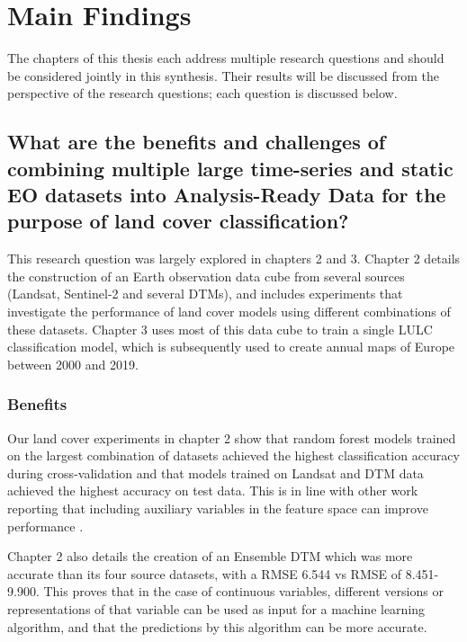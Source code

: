 \section{Main Findings}
    The chapters of this thesis each address multiple research questions and should be considered jointly in this synthesis. Their results will be discussed from the perspective of the research questions; each question is discussed below.
    
    \subsection{What are the benefits and challenges of combining multiple large time-series and static EO datasets into Analysis-Ready Data for the purpose of land cover classification?}
    \label{syn:rq1}

        This research question was largely explored in chapters 2 and 3. Chapter 2 details the construction of an Earth observation data cube from several sources (Landsat, Sentinel-2 and several DTMs), and includes experiments that investigate the performance of land cover models using different combinations of these datasets. Chapter 3 uses most of this data cube to train a single LULC classification model, which is subsequently used to create annual maps of Europe between 2000 and 2019. 

        \subsubsection{Benefits}
    
            Our land cover experiments in chapter 2 show that random forest models trained on the largest combination of datasets achieved the highest classification accuracy during cross-validation and that models trained on Landsat and DTM data achieved the highest accuracy on test data. This is in line with other work reporting that including auxiliary variables in the feature space can improve performance \citep{zhu2016optimizing, hurskainen2019auxiliary, hosseiny2022urban, santos2012multiscale}.

            Chapter 2 also details the creation of an Ensemble DTM which was more accurate than its four source datasets, with a RMSE 6.544 vs RMSE of 8.451-9.900. This proves that in the case of continuous variables, different versions or representations of that variable can be used as input for a machine learning algorithm, and that the predictions by this algorithm can be more accurate.
            
